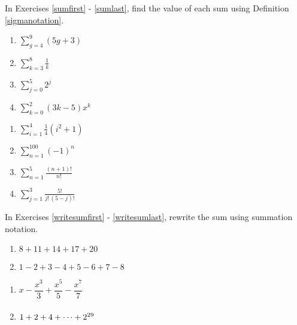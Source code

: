 In Exercises \ref{sumfirst} - \ref{sumlast}, find the value of each sum using Definition \ref{sigmanotation}.

\begin{multicols}{4} 
\begin{enumerate}

\item $\displaystyle \sum_{g = 4}^{9} (5g + 3)$  \label{sumfirst}
\item $\displaystyle \sum_{k = 3}^{8} \frac{1}{k}$
\item $\displaystyle \sum_{j = 0}^{5} 2^{j}$
\item $\displaystyle \sum_{k = 0}^{2} (3k - 5)x^{k}$

\setcounter{HW}{\value{enumi}}
\end{enumerate}
\end{multicols}

\begin{multicols}{4}
\begin{enumerate}
\setcounter{enumi}{\value{HW}}

\item $\displaystyle \sum_{i = 1}^{4} \frac{1}{4}(i^{2} + 1)$
\item $\displaystyle \sum_{n = 1}^{100} (-1)^{n}$
\item $\displaystyle \sum_{n = 1}^{5} \frac{(n+1)!}{n!}$
\item $\displaystyle \sum_{j = 1}^{3} \frac{5!}{j! \, (5-j)!}$  \label{sumlast}

\setcounter{HW}{\value{enumi}}
\end{enumerate}
\end{multicols}

In Exercises \ref{writesumfirst} - \ref{writesumlast},  rewrite the sum using summation notation.


\begin{multicols}{2}
\begin{enumerate}
\setcounter{enumi}{\value{HW}}

\item $8 + 11 + 14 + 17 + 20$  \label{writesumfirst}
\item $1 - 2 + 3 - 4 + 5 - 6 + 7 - 8$

\setcounter{HW}{\value{enumi}}
\end{enumerate}
\end{multicols}

\begin{multicols}{2}
\begin{enumerate}
\setcounter{enumi}{\value{HW}}

\item $x - \dfrac{x^{3}}{3} + \dfrac{x^{5}}{5} - \dfrac{x^{7}}{7}$
\item $1 + 2 + 4 + \cdots + 2^{29} \vphantom{x - \dfrac{x^{3}}{3} + \dfrac{x^{5}}{5} - \dfrac{x^{7}}{7}}$

\setcounter{HW}{\value{enumi}}
\end{enumerate}
\end{multicols}

